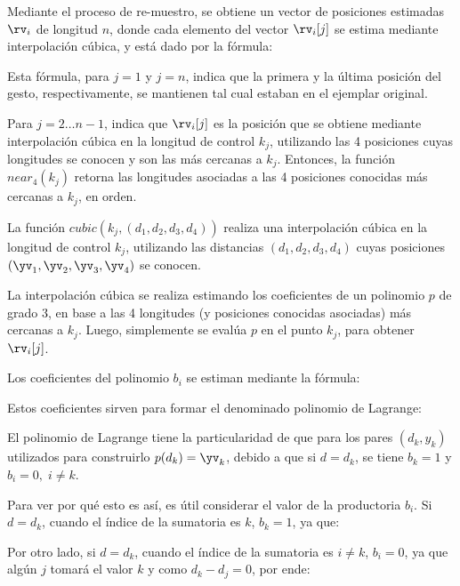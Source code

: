 Mediante el proceso de re-muestro, se obtiene un vector de posiciones estimadas $\rv_i$ de longitud $n$, donde cada elemento del vector $\rv_i[j]$ se estima mediante interpolación cúbica, y está dado por la fórmula: 


Esta fórmula, para $j=1$ y $j=n$, indica que la primera y la última posición del gesto, respectivamente, se mantienen tal cual estaban en el ejemplar original.

Para $j=2 \dots n-1$, indica que $\rv_i[j]$ es la posición que se obtiene mediante interpolación cúbica en la longitud de control $k_j$, utilizando las 4 posiciones cuyas longitudes se conocen y son las más cercanas a $k_j$. Entonces, la función $near_4(k_j)$ retorna las longitudes asociadas a las 4 posiciones conocidas más cercanas a $k_j$, en orden. 

La función $cubic(k_j,(d_1, d_2, d_3, d_4))$ realiza una interpolación cúbica en la longitud de control $k_j$, utilizando las distancias $(d_1, d_2, d_3, d_4)$  cuyas posiciones $(\yv_1,\yv_2,\yv_3,\yv_4)$ se conocen.

La interpolación cúbica se realiza estimando los coeficientes de un polinomio $p$ de grado 3, en base a las 4 longitudes (y posiciones conocidas asociadas)  más cercanas a $k_j$. Luego, simplemente se evalúa $p$ en el punto $k_j$, para obtener $\rv_i[j]$.

Los coeficientes del polinomio $b_i$ se estiman mediante la fórmula:


Estos coeficientes sirven para formar el denominado polinomio de Lagrange:

El polinomio de Lagrange tiene la particularidad de que para los pares $(d_k,y_k)$ utilizados para construirlo $p(d_k)=\yv_k$, debido a que si $d=d_k$, se tiene $b_k=1$ y $b_i=0, \; i\neq k$. 

Para ver por qué esto es así, es útil considerar el valor de la productoria $b_i$. Si $d=d_k$, cuando el índice de la sumatoria es $k$, $b_k=1$, ya que:


Por otro lado, si $d=d_k$, cuando el índice de la sumatoria es $i \neq k$, $b_i=0$, ya que algún $j$ tomará el valor $k$ y como $d_k-d_j=0$, por ende:

